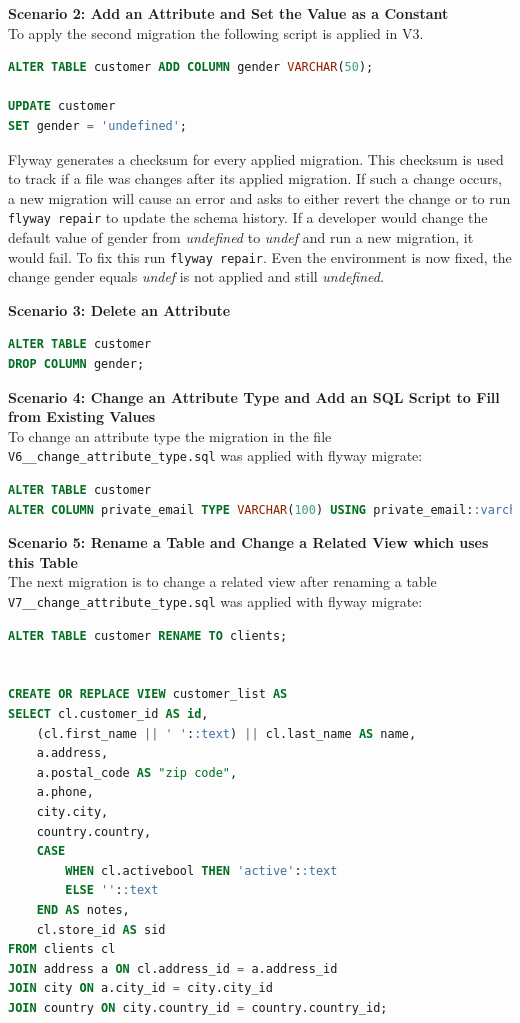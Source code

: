 \textbf{Scenario 2: Add an Attribute and Set the Value as a Constant}\\
%
To apply the second migration the following script is applied in V3.
\begin{lstlisting}[language=SQL]
ALTER TABLE customer ADD COLUMN gender VARCHAR(50);

UPDATE customer
SET gender = 'undefined';
\end{lstlisting}
Flyway generates a checksum for every applied migration. This checksum is used to track if a file was changes after its applied migration. If such a change occurs, a new migration will cause an error and asks to either revert the change or to run \texttt{flyway repair} to update the schema history.
If a developer would change the default value of gender from \textit{undefined} to \textit{undef} and run a new migration, it would fail. To fix this run \texttt{flyway repair}. Even the environment is now fixed, the change gender equals \textit{undef} is not applied and still \textit{undefined}.


\textbf{Scenario 3: Delete an Attribute}\\
%

\begin{lstlisting}[language=SQL]
ALTER TABLE customer
DROP COLUMN gender;
\end{lstlisting}


\textbf{Scenario 4: Change an Attribute Type and Add an SQL Script to Fill from Existing Values}\\
To change an attribute type the migration in the file \texttt{V6\_\_change\_attribute\_type.sql} was applied with flyway migrate:
\begin{lstlisting}[language=SQL]
ALTER TABLE customer
ALTER COLUMN private_email TYPE VARCHAR(100) USING private_email::varchar;
\end{lstlisting}


\textbf{Scenario 5: Rename a Table and Change a Related View which uses this Table}\\
%
The next migration is to change a related view after renaming a table\\
\texttt{V7\_\_change\_attribute\_type.sql} was applied with flyway migrate:
\begin{lstlisting}[language=SQL]
ALTER TABLE customer RENAME TO clients;
	
	
CREATE OR REPLACE VIEW customer_list AS
SELECT cl.customer_id AS id,
	(cl.first_name || ' '::text) || cl.last_name AS name,
	a.address,
	a.postal_code AS "zip code",
	a.phone,
	city.city,
	country.country,
	CASE
		WHEN cl.activebool THEN 'active'::text
		ELSE ''::text
	END AS notes,
	cl.store_id AS sid
FROM clients cl
JOIN address a ON cl.address_id = a.address_id
JOIN city ON a.city_id = city.city_id
JOIN country ON city.country_id = country.country_id;
\end{lstlisting}

